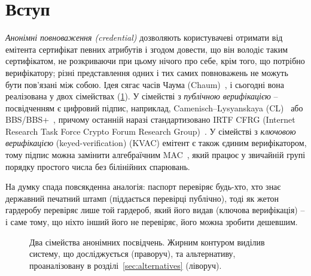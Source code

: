 \section*{Вступ}
{}

\emph{Анонімні повноваження (credential)} дозволяють користувачеві отримати від емітента сертифікат певних атрибутів 
і згодом довести, що він володіє таким сертифікатом, не розкриваючи при цьому нічого про себе, крім того, що потрібно 
верифікатору; різні представлення одних і тих самих повноважень не можуть бути пов'язані між собою. Ідея сягає 
часів Чаума (Chaum)~\cite{Chaum85}, і сьогодні вона реалізована у двох сімействах (\ref{fig:taxonomy}). У сімействі 
з \emph{публічною верифікацією} -- посвідченням є цифровий підпис, наприклад, Camenisch–Lysyanskaya (CL)~\cite{CL01} 
або BBS/BBS+~\cite{BBS04,ASM06,TZ23}, причому останній наразі стандартизовано IRTF CFRG (Internet Research Task Force 
Crypto Forum Research Group)~\cite{BBSdraft}. У сімействі з \emph{ключовою верифікацією} (keyed-verification) (KVAC) 
емітент є також єдиним верифікатором, тому підпис можна замінити алгебраїчним MAC~\cite{CMZ14}, який працює у звичайній 
групі порядку простого числа без білінійних спарювань.

На думку спада повсякденна аналогія: паспорт перевіряє будь-хто, хто знає державний печатний штамп (піддається 
перевірці публічно), тоді як жетон гардеробу перевіряє лише той гардероб, який його видав (ключова верифікація) 
-- і саме тому, що ніхто інший його не перевіряє, його можна зробити дешевшим.

\begin{figure}[!ht]
  \centering
  \begin{minipage}{0.95\linewidth}
    \centering
    
    \caption{Два сімейства анонімних посвідчень. Жирним контуром виділив систему, що досліджується (праворуч), 
      та альтернативу, проаналізовану в розділі~\ref{sec:alternatives} (ліворуч).}
    \label{fig:taxonomy}
  \end{minipage}
\end{figure}

